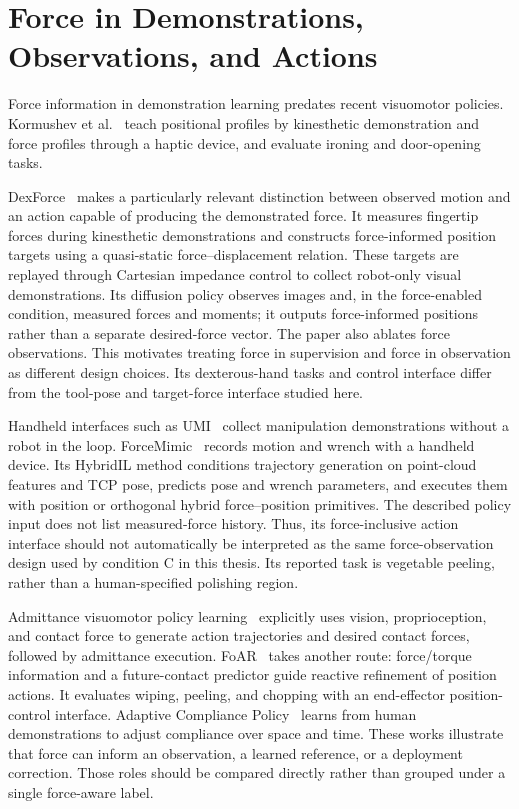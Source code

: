 \section{Force in Demonstrations, Observations, and Actions}
Force information in demonstration learning predates recent visuomotor policies. Kormushev et al.~\cite{kormushev2011imitation} teach positional profiles by kinesthetic demonstration and force profiles through a haptic device, and evaluate ironing and door-opening tasks.

DexForce~\cite{chen2025dexforce} makes a particularly relevant distinction between observed motion and an action capable of producing the demonstrated force. It measures fingertip forces during kinesthetic demonstrations and constructs force-informed position targets using a quasi-static force--displacement relation. These targets are replayed through Cartesian impedance control to collect robot-only visual demonstrations. Its diffusion policy observes images and, in the force-enabled condition, measured forces and moments; it outputs force-informed positions rather than a separate desired-force vector. The paper also ablates force observations. This motivates treating force in supervision and force in observation as different design choices. Its dexterous-hand tasks and control interface differ from the tool-pose and target-force interface studied here.

Handheld interfaces such as UMI~\cite{chi2024umi} collect manipulation demonstrations without a robot in the loop. ForceMimic~\cite{liu2025forcemimic} records motion and wrench with a handheld device. Its HybridIL method conditions trajectory generation on point-cloud features and TCP pose, predicts pose and wrench parameters, and executes them with position or orthogonal hybrid force--position primitives. The described policy input does not list measured-force history. Thus, its force-inclusive action interface should not automatically be interpreted as the same force-observation design used by condition C in this thesis. Its reported task is vegetable peeling, rather than a human-specified polishing region.

Admittance visuomotor policy learning~\cite{zhou2024admitdiff} explicitly uses vision, proprioception, and contact force to generate action trajectories and desired contact forces, followed by admittance execution. FoAR~\cite{he2025foar} takes another route: force/torque information and a future-contact predictor guide reactive refinement of position actions. It evaluates wiping, peeling, and chopping with an end-effector position-control interface. Adaptive Compliance Policy~\cite{hou2024adaptive} learns from human demonstrations to adjust compliance over space and time. These works illustrate that force can inform an observation, a learned reference, or a deployment correction. Those roles should be compared directly rather than grouped under a single force-aware label.

